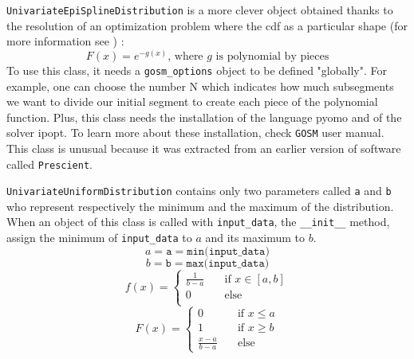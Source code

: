 \documentclass{article}
\begin{document}
	 \texttt{UnivariateEpiSplineDistribution} is a more clever object obtained thanks to the resolution of an optimization problem where the cdf as a particular shape (for more information see \cite{epispline}) : \newline
	 \begin{equation*}
  	F(x) = e^{-g(x)}\text{, where }g\text{ is polynomial by pieces}
  	\end{equation*}
  	To use this class, it needs a \texttt{gosm\_options} object to be defined "globally". For example, one can choose the number N which indicates how much subsegments we want to divide our initial segment to create each piece of the polynomial function. Plus, this class needs the installation of the language pyomo and of the solver ipopt. To learn more about these installation, check \texttt{GOSM} user manual. This class is unusual because it was extracted from an earlier version of software called \texttt{Prescient}.\newline
  	
	 
	 \texttt{UnivariateUniformDistribution} contains only two parameters called \texttt{a} and \texttt{b} who represent respectively the minimum and the maximum of the distribution. When an object of this class is called with \texttt{input\_data}, the \texttt{\_\_init\_\_} method, assign the minimum of \texttt{input\_data} to $a$ and its maximum to $b$.
	 \begin{equation*}
	 a = \texttt{a} = \texttt{min(input\_data)}
	 \end{equation*}
	 \begin{equation*}
	 b = \texttt{b}= \texttt{max(input\_data)}
	 \end{equation*}
	 \[
   		f(x) =
   		\begin{cases}
        
    	\frac{1}{b-a} & \quad \text{if } x \in [a,b]\\
    	0  & \quad \text{else}\\
  \end{cases}
  \]
	 \[
   		F(x) =
   		\begin{cases}
        0  & \quad \text{if } x \leq a \\
    	1 & \quad \text{if } x \geq b \\
    	\frac{x-a}{b-a} & \quad \text{else}
  \end{cases}
  \]
  
\end{document}
